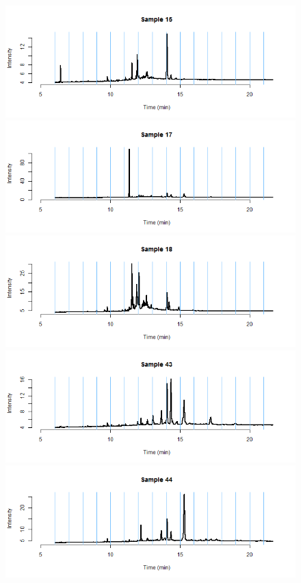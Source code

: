 \documentclass[11pt]{article}
\theoremstyle{plain}
\theoremstyle{definition}
\begin{document}
\begin{figure}[H]
\begin{center}
\includegraphics[trim ={3.5cm 2.7cm 2cm 2cm},scale=.6, clip=true]{BinPlotDMC_5.png}
\includegraphics[trim ={3.5cm 2.7cm 2cm 2cm},scale=.6, clip=true]{BinPlotDMC_6.png}
\includegraphics[trim ={3.5cm 2.7cm 2cm 2cm},scale=.6, clip=true]{BinPlotDMC_7.png}
\includegraphics[trim ={3.5cm 2.7cm 2cm 2cm},scale=.6, clip=true]{BinPlotDMC_8.png}
\includegraphics[trim ={3.5cm 2.7cm 2cm 2cm},scale=.6, clip=true]{BinPlotDMC_9.png}

\end{center}
\end{figure}
\end{document}
